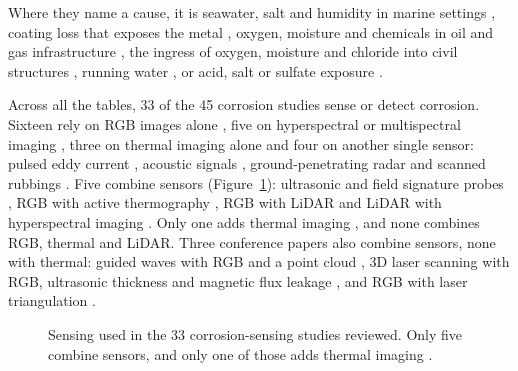 Where they name a cause, it is seawater, salt and humidity in marine settings
\citep{Hernndez-Surez2026,Arias2025,Fu2024,Imran2025,PallasEnguita2025}, coating
loss that exposes the metal \citep{Hu2023}, oxygen, moisture and chemicals in oil
and gas infrastructure \citep{Alvani2026}, the ingress of oxygen, moisture and
chloride into civil structures \citep{Bui2026}, running water \citep{Savino2025},
or acid, salt or sulfate exposure \citep{Lavadiya2022}.

Across all the tables, 33 of the 45 corrosion studies sense or detect
corrosion. Sixteen
rely on RGB images alone
\citep{Malashin2024,Mao2026,Espinoza2026,Fu2024,Alvani2026,Imran2025,Yao2019,Nash2022,Savino2025,Maharjan2025,Li2024b,Suzuki2026,Rahman2021,Hu2023,Yu2023,HerndonTien2025},
five on hyperspectral or multispectral imaging
\citep{Egodawela2025,DeKerf2022,Arias2025,Lavadiya2022,Hernndez-Surez2026}, three
on thermal imaging alone \citep{Elizalde2023,Doshvarpassand2022,Liu2021} and four
on another single sensor: pulsed eddy current \citep{Yang2025}, acoustic signals
\citep{Yang2026a}, ground-penetrating radar \citep{Bui2026} and scanned rubbings
\citep{Khodabux2021a}. Five combine sensors (Figure~\ref{fig:corr-sensing}):
ultrasonic and field signature probes \citep{Huang2026a}, RGB with active
thermography \citep{Lim2021}, RGB with LiDAR
\citep{Maru2025,PimenteldeFigueiredo2025} and LiDAR with hyperspectral imaging
\citep{PallasEnguita2025}. Only one adds thermal imaging \citep{Lim2021}, and none
combines RGB, thermal and LiDAR. Three conference papers also combine sensors,
none with thermal: guided waves with RGB and a point cloud \citep{Ding2025}, 3D
laser scanning with RGB, ultrasonic thickness and magnetic flux leakage
\citep{Zheng2025}, and RGB with laser triangulation \citep{Haitz2022}.

\begin{figure}[htbp]
\centering
{}
\caption[Sensing used in the reviewed corrosion studies]{Sensing used in the 33 corrosion-sensing studies reviewed. Only five
combine sensors, and only one of those adds thermal imaging \citep{Lim2021}.}
\label{fig:corr-sensing}
\end{figure}

